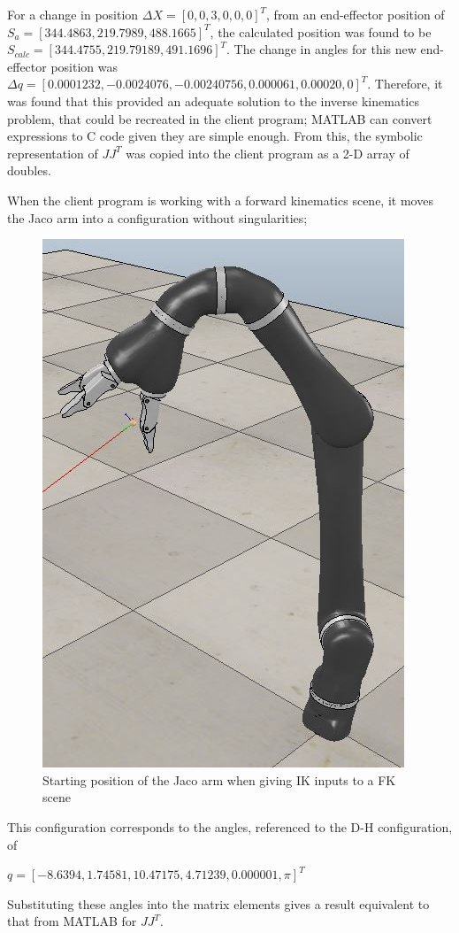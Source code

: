 \documentclass[12pt,openany,a4paper]{book}
\begin{document}
For a change in position $\Delta X = [0, 0, 3, 0, 0, 0]^T$, from an end-effector position of $S_a = [344.4863, 219.7989, 488.1665]^T$, the calculated position was found to be $S_{calc} = [ 344.4755, 219.79189, 491.1696]^T$. The change in angles for this new end-effector position was $\Delta q = [0.0001232, -0.0024076, -0.00240756, 0.000061, 0.00020, 0]^T$. Therefore, it was found that this provided an adequate solution to the inverse kinematics problem, that could be recreated in the client program; MATLAB can convert expressions to C code given they are simple enough. From this, the symbolic representation of $J J^T$ was copied into the client program as a 2-D array of doubles. 

When the client program is working with a forward kinematics scene, it moves the Jaco arm into a configuration without singularities;

\begin{center}
\begin{figure}[htb]
  \includegraphics[width=0.5\linewidth]{jaco_start_config.jpg}
\caption{ Starting position of the Jaco arm when giving IK inputs to a FK scene }
\end{figure}
\end{center}

This configuration corresponds to the angles, referenced to the D-H configuration, of

$q = [-8.6394, 1.74581, 10.47175, 4.71239, 0.000001, \pi]^T$

Substituting these angles into the matrix elements gives a result equivalent to that from MATLAB for $J J^T$.
\end{document}
